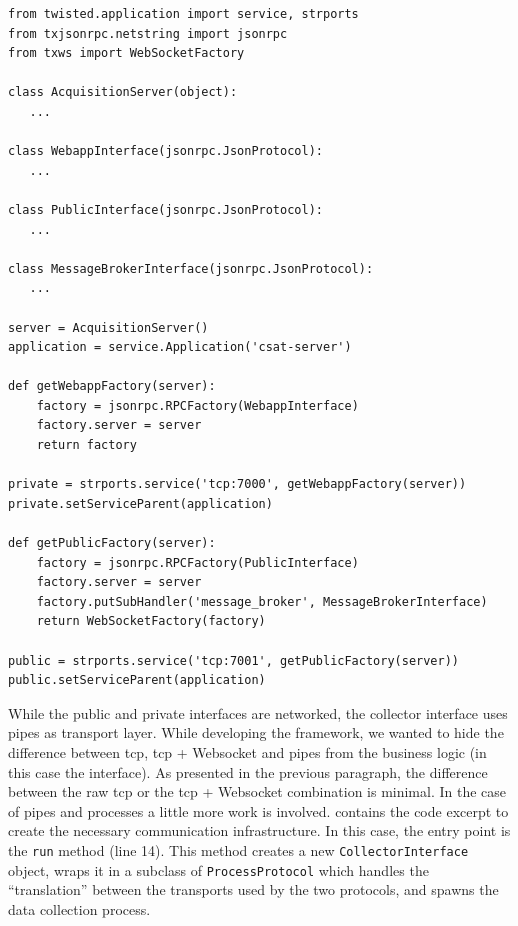 \begin{lstlisting}[caption={Creation and publication of the public and private interfaces of the acquisition server.},label=lst:interfaces]
from twisted.application import service, strports
from txjsonrpc.netstring import jsonrpc
from txws import WebSocketFactory

class AcquisitionServer(object):
   ...

class WebappInterface(jsonrpc.JsonProtocol):
   ...

class PublicInterface(jsonrpc.JsonProtocol):
   ...

class MessageBrokerInterface(jsonrpc.JsonProtocol):
   ...

server = AcquisitionServer()
application = service.Application('csat-server')

def getWebappFactory(server):
    factory = jsonrpc.RPCFactory(WebappInterface)
    factory.server = server
    return factory

private = strports.service('tcp:7000', getWebappFactory(server))
private.setServiceParent(application)

def getPublicFactory(server):
    factory = jsonrpc.RPCFactory(PublicInterface)
    factory.server = server
    factory.putSubHandler('message_broker', MessageBrokerInterface)
    return WebSocketFactory(factory)

public = strports.service('tcp:7001', getPublicFactory(server))
public.setServiceParent(application)
\end{lstlisting}

While the public and private interfaces are networked, the collector interface uses pipes as transport layer. While developing the framework, we wanted to hide the difference between \gls{tcp}, \gls{tcp} + Websocket and pipes from the business logic (in this case the interface). As presented in the previous paragraph, the difference between the raw \gls{tcp} or the \gls{tcp} + Websocket combination is minimal. In the case of pipes and processes a little more work is involved.  contains the code excerpt to create the necessary communication infrastructure. In this case, the entry point is the \texttt{run} method (line 14). This method creates a new \texttt{CollectorInterface} object, wraps it in a subclass of \texttt{ProcessProtocol} which handles the ``translation'' between the transports used by the two protocols, and spawns the data collection process.

